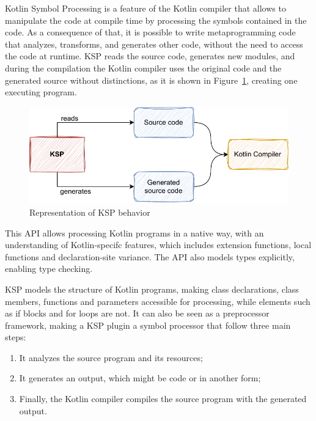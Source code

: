 Kotlin Symbol Processing is a feature of the Kotlin compiler that allows to manipulate the code at compile time by processing the symbols contained in the code. As a consequence of that, it is possible to write metaprogramming code that analyzes, transforms, and generates other code, without the need to access the code at runtime.\newline
KSP reads the source code, generates new modules, and during the compilation the Kotlin compiler uses the original code and the generated source without distinctions, as it is shown in Figure~\ref{fig:ksp_diagram}, creating one executing program.

\begin{figure}[!ht]
    \centering
    \includegraphics[scale=1]{document/chapters/2-metaprogramming/images/ksp_diagram.pdf}
    \caption{Representation of KSP behavior}
    \label{fig:ksp_diagram}
\end{figure}

This API allows processing Kotlin programs in a native way, with an understanding of Kotlin-specifc features, which includes extension functions, local functions and declaration-site variance. The API also models types explicitly, enabling type checking.

KSP models the structure of Kotlin programs, making class declarations, class members, functions and parameters accessible for processing, while elements such as if blocks and for loops are not.\newline
It can also be seen as a preprocessor framework, making a KSP plugin a symbol processor that follow three main steps:
\begin{enumerate}
    \item It analyzes the source program and its resources;
    \item It generates an output, which might be code or in another form;
    \item Finally, the Kotlin compiler compiles the source program with the generated output.
\end{enumerate}

